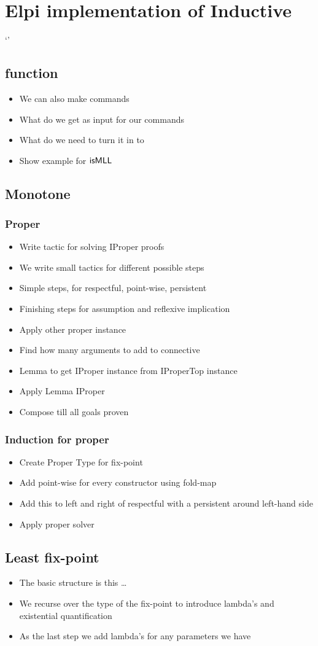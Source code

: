 \documentclass[thesis.tex]{subfiles}
\begin{document}
\chapter{Elpi implementation of Inductive}\label{ch:inductiveimpl}`'
\section{function}

\begin{itemize}
  \item We can also make commands
  \item What do we get as input for our commands
  \item What do we need to turn it in to
  \item Show example for $\textsf{\upshape isMLL}$
\end{itemize}

\section{Monotone}
\subsection{Proper}
\begin{itemize}
  \item Write tactic for solving IProper proofs
  \item We write small tactics for different possible steps
  \item Simple steps, for respectful, point-wise, persistent
  \item Finishing steps for assumption and reflexive implication
  \item Apply other proper instance
  \item Find how many arguments to add to connective
  \item Lemma to get IProper instance from IProperTop instance
  \item Apply Lemma IProper
  \item Compose till all goals proven
\end{itemize}

\subsection{Induction for proper}
\begin{itemize}
  \item Create Proper Type for fix-point
  \item Add point-wise for every constructor using fold-map
  \item Add this to left and right of respectful with a persistent around left-hand side
  \item Apply proper solver
\end{itemize}

\section{Least fix-point}
\begin{itemize}
  \item The basic structure is this \dots
  \item We recurse over the type of the fix-point to introduce lambda's and existential quantification
  \item As the last step we add lambda's for any parameters we have
\end{itemize}
\end{document}
